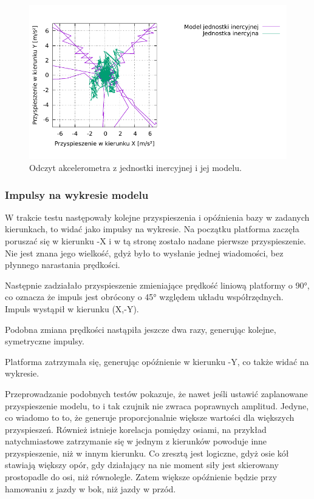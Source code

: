 		\begin{figure}[H]
			\centering
			\includegraphics[width=\textwidth]{plots/wewucho.pdf}
			\caption{Odczyt akcelerometra z jednostki inercyjnej i jej modelu.}
			\label{plot:imu}
		\end{figure}
		
		\subsubsection{Impulsy na wykresie modelu}
			W trakcie testu następowały kolejne przyspieszenia i opóźnienia bazy w zadanych kierunkach, to widać jako impulsy na wykresie.
			Na początku platforma zaczęła poruszać się w kierunku -X i w tą stronę zostało nadane pierwsze przyspieszenie.
			Nie jest znana jego wielkość, gdyż było to wysłanie jednej wiadomości, bez płynnego narastania prędkości.
			
			Następnie zadziałało przyspieszenie zmieniające prędkość liniową platformy o 90°, co oznacza że impuls jest obrócony o 45° względem układu współrzędnych.
			Impuls wystąpił w kierunku (X,-Y). 
			
			Podobna zmiana prędkości nastąpiła jeszcze dwa razy, generując kolejne, symetryczne impulsy.
			
			Platforma zatrzymała się, generując opóźnienie w kierunku -Y, co także widać na wykresie.
			
			Przeprowadzanie podobnych testów pokazuje, że nawet jeśli ustawić zaplanowane przyspieszenie modelu, to i tak czujnik nie zwraca poprawnych amplitud.
			Jedyne, co wiadomo to to, że generuje proporcjonalnie większe wartości dla większych przyspieszeń.
			Również istnieje korelacja pomiędzy osiami, na przykład natychmiastowe zatrzymanie się w jednym z kierunków powoduje inne przyspieszenie, niż w innym kierunku.
			Co zresztą jest logiczne, gdyż osie kół stawiają większy opór, gdy działający na nie moment siły jest skierowany prostopadle do osi, niż równolegle. 
			Zatem większe opóźnienie będzie przy hamowaniu z jazdy w bok, niż jazdy w przód.
			
